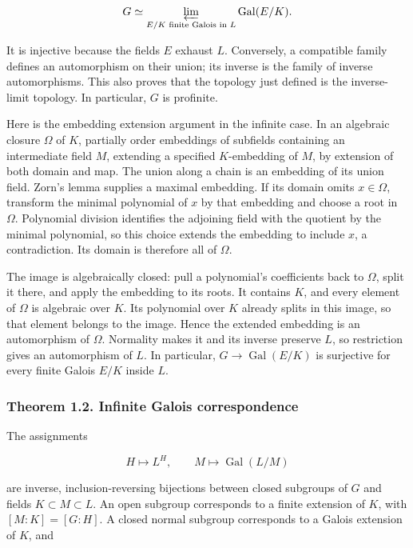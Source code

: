 \documentclass[11pt,a4paper]{article}
\begin{document}
\[
G\simeq\varprojlim_{E/K\text{ finite Galois in }L}\operatorname{Gal}(E/K).
\]

It is injective because the fields \(E\) exhaust \(L\). Conversely, a
compatible family defines an automorphism on their union; its inverse is
the family of inverse automorphisms. This also proves that the topology
just defined is the inverse-limit topology. In particular, \(G\) is
profinite.

Here is the embedding extension argument in the infinite case. In an
algebraic closure \(\Omega\) of \(K\), partially order embeddings of
subfields containing an intermediate field \(M\), extending a specified
\(K\)-embedding of \(M\), by extension of both domain and map. The union
along a chain is an embedding of its union field. Zorn's lemma supplies
a maximal embedding. If its domain omits \(x\in\Omega\), transform the
minimal polynomial of \(x\) by that embedding and choose a root in
\(\Omega\). Polynomial division identifies the adjoining field with the
quotient by the minimal polynomial, so this choice extends the embedding
to include \(x\), a contradiction. Its domain is therefore all of
\(\Omega\).

The image is algebraically closed: pull a polynomial's coefficients back
to \(\Omega\), split it there, and apply the embedding to its roots. It
contains \(K\), and every element of \(\Omega\) is algebraic over \(K\).
Its polynomial over \(K\) already splits in this image, so that element
belongs to the image. Hence the extended embedding is an automorphism of
\(\Omega\). Normality makes it and its inverse preserve \(L\), so
restriction gives an automorphism of \(L\). In particular,
\(G\to\operatorname{Gal}(E/K)\) is surjective for every finite Galois
\(E/K\) inside \(L\).

\subsubsection{Theorem 1.2. Infinite Galois
correspondence}\label{theorem-1.2.-infinite-galois-correspondence}

The assignments

\[
H\longmapsto L^H,
\qquad M\longmapsto\operatorname{Gal}(L/M)
\]

are inverse, inclusion-reversing bijections between closed subgroups of
\(G\) and fields \(K\subset M\subset L\). An open subgroup corresponds
to a finite extension of \(K\), with \([M:K]=[G:H]\). A closed normal
subgroup corresponds to a Galois extension of \(K\), and
\end{document}
